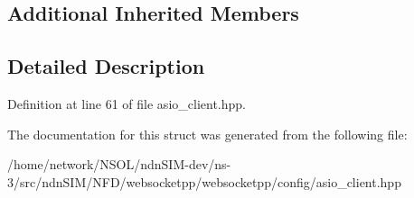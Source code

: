 \subsection*{Additional Inherited Members}


\subsection{Detailed Description}


Definition at line 61 of file asio\+\_\+client.\+hpp.



The documentation for this struct was generated from the following file\+:\begin{DoxyCompactItemize}
\item 
/home/network/\+N\+S\+O\+L/ndn\+S\+I\+M-\/dev/ns-\/3/src/ndn\+S\+I\+M/\+N\+F\+D/websocketpp/websocketpp/config/asio\+\_\+client.\+hpp\end{DoxyCompactItemize}
